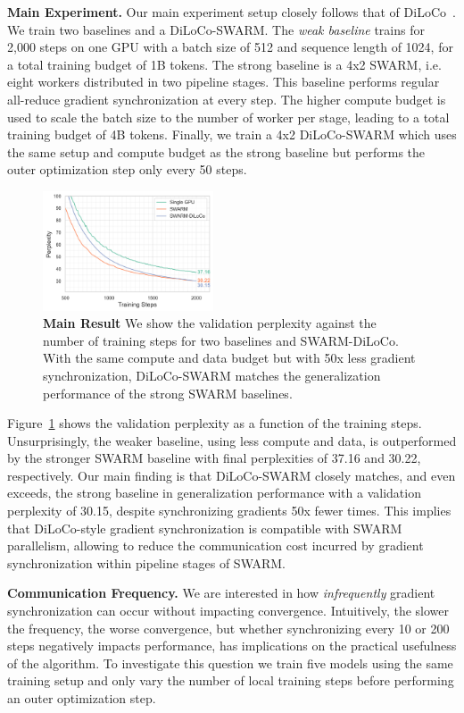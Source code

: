 \documentclass{article}
\begin{document}
\textbf{Main Experiment.} Our main experiment setup closely follows that of
DiLoCo~\cite{douillard2023}. We train two baselines and a DiLoCo-SWARM. The
\textit{weak baseline} trains for 2,000 steps on one GPU with a batch size of
512 and sequence length of 1024, for a total training budget of 1B tokens. The 
strong baseline is a 4x2 SWARM, i.e. eight workers distributed in two pipeline 
stages. This baseline performs regular all-reduce gradient synchronization at
every step. The higher compute budget is used to scale the batch size to the
number of worker per stage, leading to a total training budget of 4B tokens.
Finally, we train a 4x2 DiLoCo-SWARM which uses the same setup and compute
budget as the strong baseline but performs the outer optimization step only
every 50 steps.

\begin{figure}[ht]
  \centering
  \includegraphics[width=0.45\textwidth]{figures/experiment1.png}
  \caption{\textbf{Main Result} We show the validation perplexity against the number of training steps for two baselines and SWARM-DiLoCo. With the same compute and
  data budget but with 50x less gradient synchronization, DiLoCo-SWARM matches the 
  generalization performance of the strong SWARM baselines.}
  \label{fig:experiment1}
\end{figure}

Figure~\ref{fig:experiment1} shows the validation perplexity as a function of
the training steps. Unsurprisingly, the weaker baseline, using less compute and
data, is outperformed by the stronger SWARM baseline with final perplexities of 
37.16 and 30.22, respectively. Our main finding is that DiLoCo-SWARM closely
matches, and even exceeds, the strong baseline in generalization performance
with a validation perplexity of 30.15, despite synchronizing gradients 50x fewer
times. This implies that DiLoCo-style gradient synchronization is compatible
with SWARM parallelism, allowing to reduce the communication cost incurred by 
gradient synchronization within pipeline stages of SWARM.

\textbf{Communication Frequency.} We are interested in how \textit{infrequently}
gradient synchronization can occur without impacting convergence. Intuitively,
the slower the frequency, the worse convergence, but whether synchronizing every
10 or 200 steps negatively impacts performance, has implications on the
practical usefulness of the algorithm. To investigate this question we train
five models using the same training setup and only vary the number of local
training steps before performing an outer optimization step.
\end{document}
